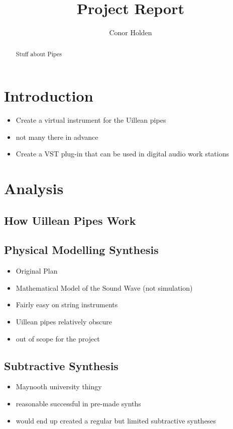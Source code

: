 \documentclass{article}
\title{Project Report}
\author{Conor Holden }
\begin{document}
	
	\maketitle
	
	\begin{abstract}
	Stuff about Pipes
	
		
	\end{abstract}

	
	
	
	\tableofcontents
	
	
	\section{Introduction}
	
	\begin{itemize}
		\item Create a virtual instrument for the Uillean pipes
		\item not many there in advance
		\item Create a VST plug-in that can be used in digital audio work stations
	\end{itemize}
	
	
	\section{Analysis}
	
	
	\subsection{How Uillean Pipes Work}	
	
	\subsection{Physical Modelling Synthesis}
	\begin{itemize}
		\item Original Plan
		\item Mathematical Model of the Sound Wave (not simulation)
		\item Fairly easy on string instruments
		\item Uillean pipes relatively obscure
		\item out of scope for the project
	\end{itemize}

	\subsection{Subtractive Synthesis}
	\begin{itemize}
		\item Maynooth university thingy
		\item reasonable successful in pre-made synths
		\item would end up created a regular but limited subtractive syntheses
	\end{itemize}
	
\end{document}
